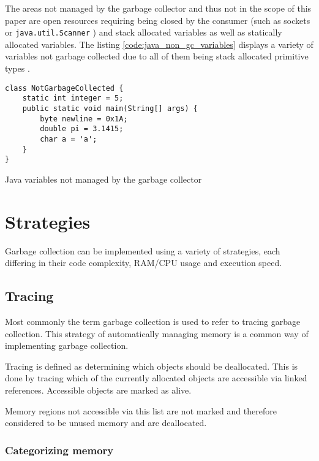 The areas not managed by the garbage collector and thus not in the scope of
this paper are open resources requiring being closed by the consumer (such as
sockets or \texttt{java.util.Scanner} \cite[close]{java-util-scanner}) and
stack allocated variables as well as statically allocated variables. The
listing \autoref{code:java_non_gc_variables} displays a variety of variables
not garbage collected due to all of them being stack allocated primitive types
\cite[4.2. Primitive Types and Values]{java_language_spec_2023}.

\begin{listing}[H] 
    \begin{verbatim} 
class NotGarbageCollected {
    static int integer = 5;
    public static void main(String[] args) {
        byte newline = 0x1A;
        double pi = 3.1415;
        char a = 'a';
    }
}
    \end{verbatim}
    \caption{Java variables not managed by the garbage collector}
    \label{code:java_non_gc_variables}
\end{listing}

\section{Strategies}

Garbage collection can be implemented using a variety of strategies, each
differing in their code complexity, RAM/CPU usage and execution speed.

\subsection{Tracing}

Most commonly the term garbage collection is used to refer to tracing garbage
collection. This strategy of automatically managing memory is a common way of
implementing garbage collection.

Tracing is defined as determining which objects should be deallocated. This is
done by tracing which of the currently allocated objects are accessible via
linked references. Accessible objects are marked as alive.

Memory regions not accessible via this list are not marked and therefore
considered to be unused memory and are deallocated.

\subsubsection{Categorizing memory}
\label{sec:categorizing_memory}


